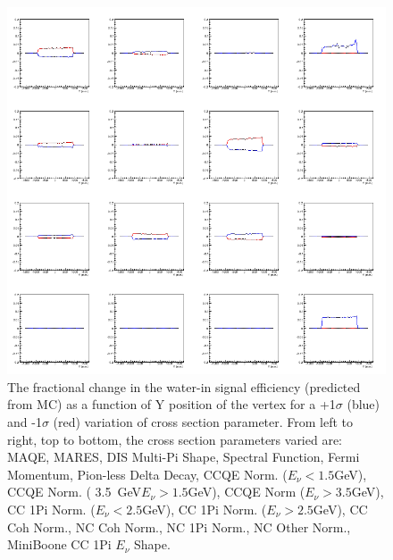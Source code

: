 \begin{figure}[H]
\centering
\includegraphics[width=5in]{Figures/TN100Plots/c_10_0.png}
\caption{The fractional change in the water-in signal efficiency (predicted from MC) as a function of Y position of the vertex for a +1$\sigma$ (blue) and -1$\sigma$ (red) variation of cross section parameter. From left to right, top to bottom, the cross section parameters varied are: MAQE, MARES, DIS Multi-Pi Shape, Spectral Function, Fermi Momentum, Pion-less Delta Decay, CCQE Norm. ($E_\nu < 1.5$GeV), CCQE Norm. ( 3.5~GeV$E_\nu>1.5$GeV), CCQE Norm ($E_\nu > 3.5$GeV), CC 1Pi Norm. ($E_\nu < 2.5$GeV), CC 1Pi Norm. ($E_\nu > 2.5$GeV), CC Coh Norm., NC Coh Norm., NC 1Pi Norm., NC Other Norm., MiniBoone CC 1Pi $E_\nu$ Shape.}
\label{fig:xsvarYwE}
\end{figure}

